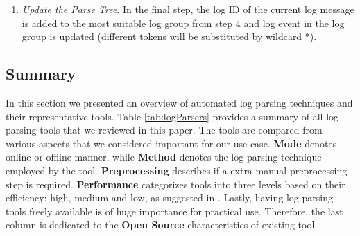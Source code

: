 \begin{enumerate}
        \item \textit{Update the Parse Tree}. In the final step, the log ID of the current log message is added to the most suitable log group from step $4$ and log event in the log group is updated (different tokens will be substituted by wildcard *). 
    \end{enumerate}

    \subsection{Summary}
    In this section we presented an overview of automated log parsing techniques and their representative tools. Table \ref{tab:logParsers} provides a summary of all log parsing tools that we reviewed in this paper. The tools are compared from various aspects that we considered important for our use case. \textbf{Mode} denotes online or offline manner, while \textbf{Method} denotes the log parsing technique employed by the tool. \textbf{Preprocessing} describes if a extra manual preprocessing step is required. \textbf{Performance} categorizes tools into three levels based on their efficiency: high, medium and low, as suggested in \cite{zhlhxzl2018}. Lastly, having log parsing tools freely available is of huge importance for practical use. Therefore, the last column is dedicated to the \textbf{Open Source} characteristics of existing tool. 
    
    \begin{table}[t]
    \centering
    \caption{Summary of automated log parsing tools}
    \label{tab:logParsers}
    \end{table} 
    
